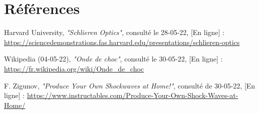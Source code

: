 \section*{Références}
\parindent0pt
\begin{enumerate}[label = {[\arabic*]}]
	\item Harvard University, \textit{"Schlieren Optics"}, consulté le 28-05-22, [En ligne] : \small\url{https://sciencedemonstrations.fas.harvard.edu/presentations/schlieren-optics}\label{ref:harvardedu}
	\item Wikipedia (04-05-22), \textit{"Onde de choc"}, consulté le 30-05-22, [En ligne] : \small\url{https://fr.wikipedia.org/wiki/Onde_de_choc}
	\label{ref:wiki_choc}
	\item F. Zigunov, \textit{"Produce Your Own Shockwaves at Home!"}, consulté de 30-05-22, [En ligne] : \small\url{https://www.instructables.com/Produce-Your-Own-Shock-Waves-at-Home/}
	\label{ref:zigunov}
\end{enumerate}